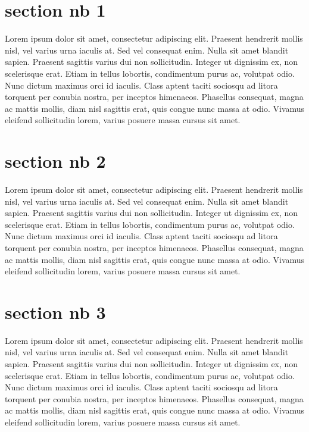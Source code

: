 \documentclass[a4paper, 11pt]{report}
\begin{document}
\section{section nb 1}

Lorem ipsum dolor sit amet, consectetur adipiscing elit.
Praesent hendrerit mollis nisl, vel varius urna iaculis at.
Sed vel consequat enim.
Nulla sit amet blandit sapien.
Praesent sagittis varius dui non sollicitudin.
Integer ut dignissim ex, non scelerisque erat.
Etiam in tellus lobortis, condimentum purus ac, volutpat odio.
Nunc dictum maximus orci id iaculis.
Class aptent taciti sociosqu ad litora torquent per conubia nostra, 
per inceptos himenaeos.
Phasellus consequat, magna ac mattis mollis, diam nisl sagittis erat, 
quis congue nunc massa at odio.
Vivamus eleifend sollicitudin lorem, varius posuere massa cursus sit 
amet.

\section{section nb 2}

Lorem ipsum dolor sit amet, consectetur adipiscing elit.
Praesent hendrerit mollis nisl, vel varius urna iaculis at.
Sed vel consequat enim.
Nulla sit amet blandit sapien.
Praesent sagittis varius dui non sollicitudin.
Integer ut dignissim ex, non scelerisque erat.
Etiam in tellus lobortis, condimentum purus ac, volutpat odio.
Nunc dictum maximus orci id iaculis.
Class aptent taciti sociosqu ad litora torquent per conubia nostra, 
per inceptos himenaeos.
Phasellus consequat, magna ac mattis mollis, diam nisl sagittis erat, 
quis congue nunc massa at odio.
Vivamus eleifend sollicitudin lorem, varius posuere massa cursus sit 
amet.

\section{section nb 3}

Lorem ipsum dolor sit amet, consectetur adipiscing elit.
Praesent hendrerit mollis nisl, vel varius urna iaculis at.
Sed vel consequat enim.
Nulla sit amet blandit sapien.
Praesent sagittis varius dui non sollicitudin.
Integer ut dignissim ex, non scelerisque erat.
Etiam in tellus lobortis, condimentum purus ac, volutpat odio.
Nunc dictum maximus orci id iaculis.
Class aptent taciti sociosqu ad litora torquent per conubia nostra, 
per inceptos himenaeos.
Phasellus consequat, magna ac mattis mollis, diam nisl sagittis erat, 
quis congue nunc massa at odio.
Vivamus eleifend sollicitudin lorem, varius posuere massa cursus sit 
amet.
\end{document}
